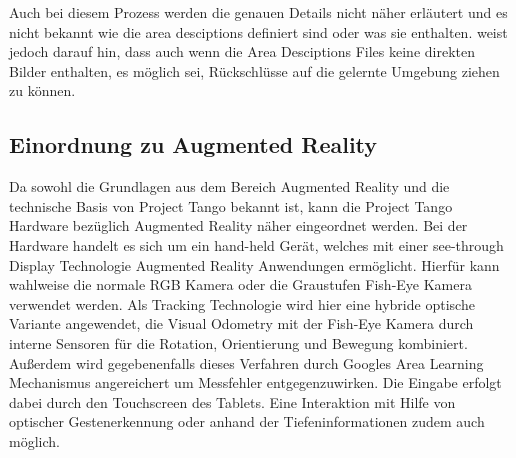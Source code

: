 Auch bei diesem Prozess werden die genauen Details nicht näher erläutert und es nicht bekannt wie die area desciptions definiert sind oder was sie enthalten. \citep{GoogleDevelopersConcepts:online} weist jedoch darauf hin, dass auch wenn die Area Desciptions Files keine direkten Bilder enthalten, es möglich sei, Rückschlüsse auf die gelernte Umgebung ziehen zu können. \\

\subsection{Einordnung zu Augmented Reality}

Da sowohl die Grundlagen aus dem Bereich Augmented Reality und die technische Basis von Project Tango bekannt ist, kann die Project Tango Hardware bezüglich Augmented Reality näher eingeordnet werden. Bei der Hardware handelt es sich um ein hand-held Gerät, welches mit einer see-through Display Technologie Augmented Reality Anwendungen ermöglicht. Hierfür kann wahlweise die normale RGB Kamera oder die Graustufen Fish-Eye Kamera verwendet werden. Als Tracking Technologie wird hier eine hybride optische Variante angewendet, die Visual Odometry mit der Fish-Eye Kamera durch interne Sensoren für die Rotation, Orientierung und Bewegung kombiniert. Außerdem wird gegebenenfalls dieses Verfahren durch Googles Area Learning Mechanismus angereichert um Messfehler entgegenzuwirken. Die Eingabe erfolgt dabei durch den Touchscreen des Tablets. Eine Interaktion mit Hilfe von optischer Gestenerkennung oder anhand der Tiefeninformationen zudem auch möglich. \\
